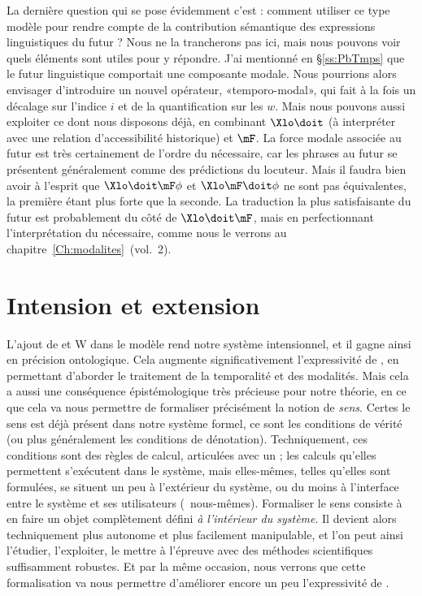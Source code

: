 La dernière question qui se pose évidemment c'est : comment utiliser ce type modèle pour rendre compte de la contribution sémantique des expressions linguistiques du futur ?
Nous ne la trancherons pas ici, mais nous pouvons voir quels éléments sont utiles pour y répondre. 
J'ai mentionné en \S\ref{ss:PbTmps} que le futur linguistique comportait une composante modale. Nous pourrions alors envisager d'introduire un nouvel opérateur, «temporo-modal», qui fait à la fois un décalage sur l'indice $i$ et de la quantification sur les $w$. 
Mais nous  pouvons aussi exploiter ce dont nous disposons déjà, en combinant $\Xlo\doit$ (à interpréter avec une relation d'accessibilité historique) et $\mF$.
La force modale associée au futur est très certainement de l'ordre du nécessaire, car les phrases au futur se présentent généralement comme des prédictions du locuteur. Mais il faudra bien avoir à l'esprit  
que $\Xlo\doit\mF\phi$ et $\Xlo\mF\doit\phi$ ne sont pas équivalentes, la première étant plus forte que la seconde. 
La traduction la plus satisfaisante du futur est probablement du côté de $\Xlo\doit\mF$, mais en perfectionnant l'interprétation du nécessaire, comme nous le verrons au chapitre~\ref{Ch:modalites}~(vol.~2).

\medskip








\section{Intension et extension} %
\label{s:intension}

L'ajout de {\Tps} et  \Unv W dans le modèle rend notre système intensionnel, et il gagne ainsi en précision ontologique. 
Cela augmente significativement l'expressivité de {\LO}, en permettant d'aborder le traitement de la temporalité et des modalités. 
Mais cela a aussi une conséquence épistémologique très précieuse pour notre théorie, en ce que cela va nous permettre de formaliser précisément la notion de \emph{sens}.
Certes le sens est déjà présent dans notre système formel, ce sont les conditions de vérité (ou plus généralement les conditions de dénotation). 
Techniquement, ces conditions sont des règles de calcul, articulées avec un  ; les calculs qu'elles permettent s'exécutent dans le système, mais elles-mêmes, telles qu'elles sont formulées, se situent un peu à l'extérieur du système, ou du moins à l'interface entre le système et ses utilisateurs (\ie\ nous-mêmes).
Formaliser le sens consiste à en faire un objet complètement défini \emph{à l'intérieur du système}. Il devient alors techniquement plus autonome et plus facilement manipulable, et l'on peut ainsi l'étudier, l'exploiter, le mettre à l'épreuve avec des méthodes scientifiques suffisamment robustes.  Et par la même occasion, nous verrons que cette formalisation va nous permettre d'améliorer encore un peu l'expressivité de {\LO}. 


